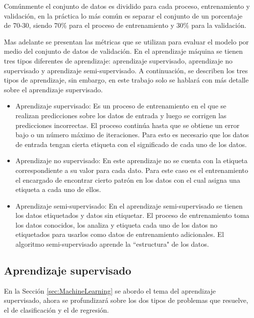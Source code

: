Comúnmente el conjunto de datos es dividido para cada proceso, entrenamiento y validación, en la práctica lo más común es separar el conjunto de un porcentaje de 70-30, siendo 70\% para el proceso de entrenamiento y 30\% para la validación.

Mas adelante se presentan las métricas que se utilizan para evaluar el modelo por medio del conjunto de datos de validación. En el aprendizaje máquina se tienen tres tipos diferentes de aprendizaje: aprendizaje supervisado, aprendizaje no supervisado y aprendizaje semi-supervisado. A continuación, se describen los tres tipos de aprendizaje, sin embargo, en este trabajo solo se hablará con más detalle sobre el aprendizaje supervisado.

\begin{itemize}

    \item Aprendizaje supervisado: Es un proceso de entrenamiento en el que se realizan predicciones sobre los datos de entrada y luego se corrigen las predicciones incorrectas. El proceso continúa hasta que se obtiene un error bajo o un número máximo de iteraciones. Para esto es necesario que los datos de entrada tengan cierta etiqueta con el significado de cada uno de los datos.

    \item Aprendizaje no supervisado: En este aprendizaje no se cuenta con la etiqueta correspondiente a su valor para cada dato. Para este caso es el entrenamiento el encargado de encontrar cierto patrón en los datos con el cual asigna una etiqueta a cada uno de ellos.

    \item Aprendizaje semi-supervisado: En el aprendizaje semi-supervisado se tienen los datos etiquetados y datos sin etiquetar. El proceso de entrenamiento toma los datos conocidos, los analiza y etiqueta cada uno de los datos no etiquetados para usarlos como datos de entrenamiento adicionales. El algoritmo semi-supervisado aprende la “estructura" de los datos.

\end{itemize}


\subsection{Aprendizaje supervisado}

En la Sección \ref{sec:MachineLearning} se abordo el tema del aprendizaje supervisado, ahora se profundizará sobre los dos tipos de problemas que resuelve, el de clasificación y el de regresión.

